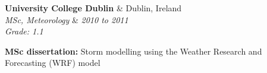 \documentclass[11pt]{article}
\makeatletter
\newenvironment{newparagraph}{\par\setlength{\rightskip}{3cm}}
\newenvironment{resumeSubSectionHeader}{
    \par
    \begin{tabular*}{\textwidth}{l@{\extracolsep{\fill}}r}
    \par
} {
    \end{tabular*}
    \par
}
\newenvironment{resumeSubSectionBody}{
    \par
    \vspace{-0.8\parskip}
    \begin{small}
    \par
} {
    \par
    \end{small}
    \par
}
\makeatother
\begin{document}
\begin{resumeSubSectionBody}

\end{resumeSubSectionBody}

%
%
\begin{resumeSubSectionHeader}

    \textbf{University College Dublin} & Dublin, Ireland \\
    \emph{MSc, Meteorology} & \emph{2010 to 2011} \\
    \emph{Grade: 1.1}

\end{resumeSubSectionHeader}
\begin{resumeSubSectionBody}

    \begin{description}
        \item{\bf MSc dissertation:}
			Storm modelling using the Weather Research and Forecasting (WRF) model         
    \end{description}

\end{resumeSubSectionBody}
\end{document}
